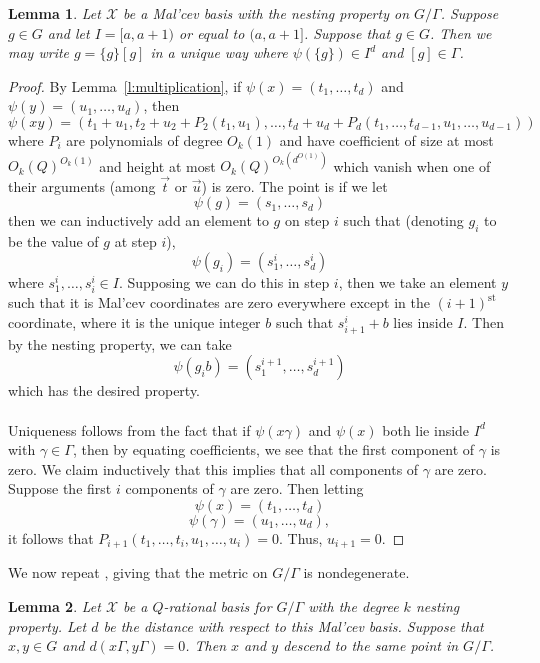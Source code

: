 \documentclass[11pt, a4paper]{amsart}
\theoremstyle{plain}
\theoremstyle{plain}
\newtheorem{lemma}{Lemma}
\theoremstyle{definition}
\theoremstyle{remark}
\numberwithin{equation}{section}
\numberwithin{lemma}{section}
\numberwithin{proposition}{section}
\numberwithin{corollary}{section}
\numberwithin{definition}{section}
\numberwithin{claim}{section}
\begin{document}
\begin{lemma}\label{l:decomposition}
Let $\mathcal{X}$ be a Mal'cev basis with the nesting property on $G/\Gamma$. Suppose $g \in G$ and let $I = [a, a + 1)$ or equal to $(a, a + 1]$. Suppose that $g \in G$. Then we may write $g = \{g\}[g]$ in a unique way where $\psi(\{g\}) \in I^d$ and $[g] \in \Gamma$.
\end{lemma}
\begin{proof}
By Lemma~\ref{l:multiplication}, if $\psi(x) = (t_1, \dots, t_d)$ and $\psi(y) = (u_1, \dots, u_d)$, then
$$\psi(xy) = (t_1 + u_1, t_2 + u_2 + P_2(t_1, u_1), \dots, t_d + u_d + P_{d }(t_1, \dots, t_{d - 1}, u_1, \dots, u_{d - 1}))$$
where $P_i$ are polynomials of degree $O_k(1)$ and have coefficient of size at most $O_k(Q)^{O_k(1)}$ and height at most $O_k(Q)^{O_k(d^{O(1)})}$ which vanish when one of their arguments (among $\vec{t}$ or $\vec{u}$) is zero. The point is if we let
$$\psi(g) = (s_1, \dots, s_d)$$
then we can inductively add an element to $g$ on step $i$ such that (denoting $g_i$ to be the value of $g$ at step $i$),
$$\psi(g_i) = (s_1^i, \dots, s_d^i)$$
where $s_1^i, \dots, s_i^i \in I$. Supposing we can do this in step $i$, then we take an element $y$ such that it is Mal'cev coordinates are zero everywhere except in the $(i + 1)^{\mathrm{st}}$ coordinate, where it is the unique integer $b$ such that $s_{i + 1}^i + b$ lies inside $I$. Then by the nesting property, we can take
$$\psi(g_ib) = (s_1^{i + 1}, \dots, s_d^{i + 1})$$
which has the desired property. \\\\
Uniqueness follows from the fact that if $\psi(x\gamma)$ and $\psi(x)$ both lie inside $I^d$ with $\gamma \in \Gamma$, then by equating coefficients, we see that the first component of $\gamma$ is zero. We claim inductively that this implies that all components of $\gamma$ are zero. Suppose the first $i$ components of $\gamma$ are zero. Then letting
$$\psi(x) = (t_1, \dots, t_d)$$
$$\psi(\gamma) = (u_1, \dots, u_d),$$
it follows that $P_{i + 1}(t_1, \dots, t_i, u_1, \dots, u_i) = 0$. Thus, $u_{i + 1} = 0$.
\end{proof}
We now repeat \cite[Lemma A.15]{GT12}, giving that the metric on $G/\Gamma$ is nondegenerate.
\begin{lemma}\label{l:nondegen}
Let $\mathcal{X}$ be a $Q$-rational basis for $G/\Gamma$ with the degree $k$ nesting property. Let $d$ be the distance with respect to this Mal'cev basis. Suppose that $x, y\in G$ and $d(x\Gamma, y\Gamma) = 0$. Then $x$ and $y$ descend to the same point in $G/\Gamma$.
\end{lemma}
\end{document}
